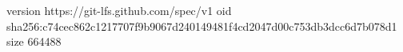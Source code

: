 version https://git-lfs.github.com/spec/v1
oid sha256:c74cec862c1217707f9b9067d240149481f4cd2047d00c753db3dcc6d7b078d1
size 664488
